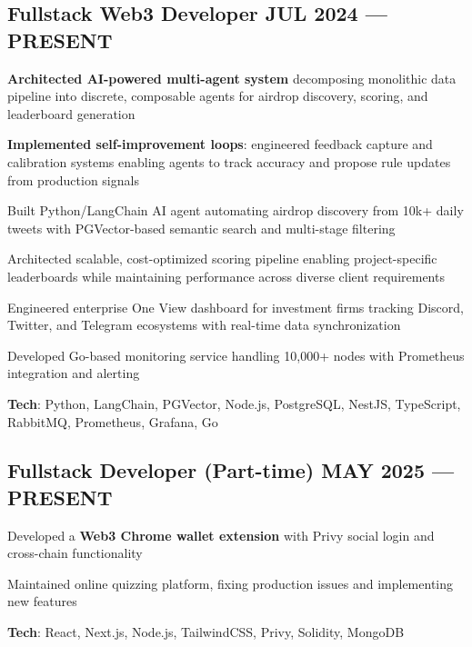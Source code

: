 \documentclass[letter,10pt]{article}
\begin{document}
\subsection{{Fullstack Web3 Developer \hfill JUL 2024 --- PRESENT}}
\begin{zitemize}
  \item \textbf{Architected AI-powered multi-agent system} decomposing monolithic data pipeline into discrete, composable agents for airdrop discovery, scoring, and leaderboard generation
  \item \textbf{Implemented self-improvement loops}: engineered feedback capture and calibration systems enabling agents to track accuracy and propose rule updates from production signals
  \item Built Python/LangChain AI agent automating airdrop discovery from 10k+ daily tweets with PGVector-based semantic search and multi-stage filtering
  \item Architected scalable, cost-optimized scoring pipeline enabling project-specific leaderboards while maintaining performance across diverse client requirements
  \item Engineered enterprise One View dashboard for investment firms tracking Discord, Twitter, and Telegram ecosystems with real-time data synchronization
  \item Developed Go-based monitoring service handling 10,000+ nodes with Prometheus integration and alerting
  \item \textbf{Tech}: Python, LangChain, PGVector, Node.js, PostgreSQL, NestJS, TypeScript, RabbitMQ, Prometheus, Grafana, Go
\end{zitemize}


\subsection{{Fullstack Developer (Part-time) \hfill MAY 2025 --- PRESENT}}
\begin{zitemize}
  \item Developed a \textbf{Web3 Chrome wallet extension} with Privy social login and cross-chain functionality
  \item Maintained online quizzing platform, fixing production issues and implementing new features
  \item \textbf{Tech}: React, Next.js, Node.js, TailwindCSS, Privy, Solidity, MongoDB
\end{zitemize}
\end{document}
